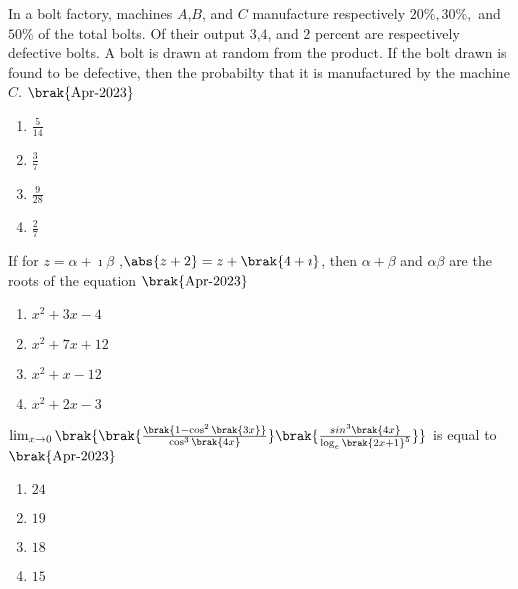 \item{
In a bolt factory, machines $A$,$B$, and $C$ manufacture respectively $20\%, 30\%,$ and $50\%$ of the total bolts. Of their output $3$,$4$, and $2$ percent are respectively defective bolts. A bolt is drawn at random from the product. If the bolt drawn is found to be defective, then the probabilty that it is manufactured by the machine $C$.
\hfill{$\brak{\text{Apr-2023}}$}
\begin{multicols}{4}
\begin{enumerate}
\item $\frac{5}{14}$
\item $\frac{3}{7}$
\item $\frac{9}{28}$
\item $\frac{2}{7}$
\end{enumerate}
\end{multicols}
}
\item{
If for $z=\alpha+\imath\beta$  ,$\abs{z+2}=z+\brak{4+\imath}$, then $\alpha+\beta$ and $\alpha\beta$ are the roots of the equation
\hfill{$\brak{\text{Apr-2023}}$}
\begin{multicols}{4}
\begin{enumerate}
\item $x^2+3x-4$
\item $x^2+7x+12$
\item $x^2+x-12$
\item $x^2+2x-3$
\end{enumerate}
\end{multicols}
}
\item{
$\lim_{x \to 0}\brak{\brak{\frac{\brak{1-\cos^2\brak{3x}}}{\cos^3\brak{4x}}}\brak{\frac{sin^3\brak{4x}}{\log_e\brak{2x+1}^5}}}$ is equal to
\hfill{$\brak{\text{Apr-2023}}$}
\begin{multicols}{4}
\begin{enumerate}
\item $24$
\item $19$
\item $18$
\item $15$
\end{enumerate}
\end{multicols}
}

